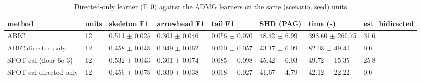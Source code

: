 \begin{table}[t]
\centering\footnotesize
\caption{Directed-only learner (E10) against the ADMG learners on the same (scenario, seed) units}\label{tab:T2e_directed_only}
\begin{tabular}{@{}llllllll@{}}
\toprule
method & units & skeleton F1 & arrowhead F1 & tail F1 & SHD (PAG) & time (s) & est\_bidirected\\
\midrule
ABIC & 12 & 0.511 $\pm$ 0.025 & 0.301 $\pm$ 0.046 & 0.056 $\pm$ 0.070 & 48.42 $\pm$ 6.99 & 393.60 $\pm$ 260.75 & 31.6\\
ABIC directed-only & 12 & 0.458 $\pm$ 0.048 & 0.049 $\pm$ 0.062 & 0.030 $\pm$ 0.057 & 43.17 $\pm$ 6.09 & 82.03 $\pm$ 49.40 & 0.0\\
SPOT-cal (floor 6e-3) & 12 & 0.532 $\pm$ 0.043 & 0.301 $\pm$ 0.074 & 0.085 $\pm$ 0.098 & 45.42 $\pm$ 6.93 & 49.72 $\pm$ 15.35 & 25.8\\
SPOT-cal directed-only & 12 & 0.459 $\pm$ 0.078 & 0.030 $\pm$ 0.038 & 0.008 $\pm$ 0.027 & 41.67 $\pm$ 4.79 & 42.12 $\pm$ 22.22 & 0.0\\
\bottomrule
\end{tabular}
\end{table}
